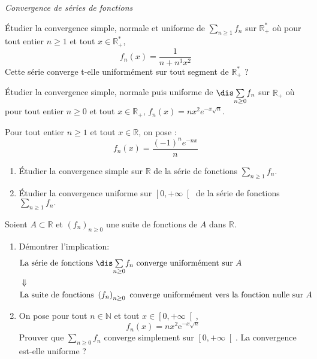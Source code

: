 \documentclass[a4paper,10pt]{report}
\newcommand{\Sum}[2]{\ensuremath{\textstyle{\sum\limits_{#1}^{#2}}}}
\begin{document}
\medskip

\begin{center}
\textit{{ {\large Convergence de séries de fonctions}}}
\end{center}

\medskip

\begin{Exa} Étudier la convergence simple, normale et uniforme de $\Sum{n\geq 1}{} f_n$ sur $\mathbb{R}_+^*$ où pour tout entier $n \geq 1$ et tout $x \in \mathbb{R}_+^*$, 
$$ f_n(x) = \frac{1}{n+n^3x^2}$$
Cette série converge t-elle uniformément sur tout segment de $\mathbb{R}_+^*$ ?
\end{Exa} 



\begin{Exa}[\ding{80}] Étudier la convergence simple, normale puis uniforme de $\dis \Sum{n\geq 0}{} f_n$ sur $\mathbb{R}_+$ où pour tout entier $n \geq 0$ et tout $x \in \mathbb{R}_+$, $f_n(x) = nx^2e^{-x\sqrt{n}}.$
\end{Exa}

\begin{Exa} Pour tout entier $n \geq 1$ et tout $x \in \mathbb{R}$, on pose :
$$ f_n(x) = \dfrac{\left(-1\right)^{n}e^{-nx}}{n} $$

\begin{enumerate}
\item \'Etudier la convergence simple sur $\mathbb{R}$  de la série de fonctions $\Sum{n\geq 1}{} f_n.$
\item \'Etudier la convergence uniforme sur $\left[ 0,+\infty\right[ $  de la série de fonctions $\Sum{n\geq 1}{} f_n.$
\end{enumerate}
\end{Exa}

 


\begin{Exa}[\ding{80}] Soient $A\subset \mathbb{R}$ et $\left( f_{n}\right)_{n \geq 0}$ une suite de fonctions de $A$ dans $\mathbb{R}$.

\begin{enumerate}
\item D\'{e}montrer l'implication:
	\begin{eqnarray*}
	&  \text{La s\'{e}rie de fonctions }\dis \Sum{n\geq 0}{} f_n\ \text{converge uniform\'{e}ment sur $A$}& \\
	&\Downarrow &\\
	&\text{La suite de fonctions\ }\left( f_{n}\right) _{n \geq 0}\ \text{converge uniform\'{e}ment vers la fonction nulle sur $A$}&
	\end{eqnarray*}
\item
On pose pour tout $n\in\mathbb{N}$ et tout $x\in\left[ 0,+\infty\right[ $, 
$$f_n(x)=nx^2\mathrm{e}^{-x\sqrt{n}}$$
Prouver que $\Sum{n\geq 0}{} f_n$ converge simplement sur $\left[ 0,+\infty\right[$. La convergence est-elle uniforme ?
\end{enumerate}
\end{Exa}
\end{document}
